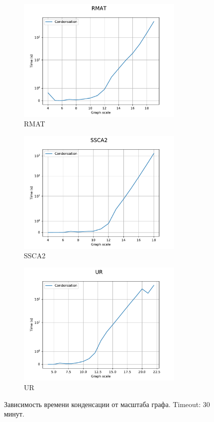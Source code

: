 \documentclass[12pt,a4paper,oneside,openany]{article}
\theoremstyle{definition}
\theoremstyle{lemma}
\theoremstyle{remark}
\begin{document}
\begin{figure}[H]
    \begin{subfigure}{.5\textwidth}
      \centering
      \includegraphics[width=8cm]{images/condensation_RMAT.pdf}
      \caption{RMAT}
      \label{fig:condensation:rmat}
    \end{subfigure}
    \begin{subfigure}{.5\textwidth}
      \centering
      \includegraphics[width=8cm]{images/condensation_SSCA2.pdf}
      \caption{SSCA2}
      \label{fig:condensation:ssca}
    \end{subfigure}
    \begin{subfigure}{.5\textwidth}
      \centering
      \includegraphics[width=8cm]{images/condensation_UR.pdf}
      \caption{UR}
      \label{fig:condensation:ur}
    \end{subfigure}
    \caption{Зависимость времени конденсации от масштаба графа. Timeout: 30 минут.}
    \label{fig:condensation}
\end{figure}
\end{document}
